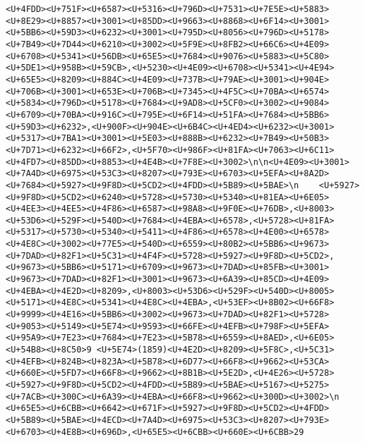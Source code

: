 \documentclass[
]{article}
\begin{document}
\begin{verbatim}
<U+4FDD><U+751F><U+6587><U+5316><U+796D><U+7531><U+7E5E><U+5883><U+8E29><U+8857><U+3001><U+85DD><U+9663><U+8868><U+6F14><U+3001><U+5BB6><U+59D3><U+6232><U+3001><U+795D><U+8056><U+796D><U+5178><U+7B49><U+7D44><U+6210><U+3002><U+5F9E><U+8FB2><U+66C6><U+4E09><U+6708><U+5341><U+56DB><U+65E5><U+7684><U+9076><U+5883><U+5C80><U+5DE1><U+958B><U+59CB>,<U+5230><U+4E09><U+6708><U+5341><U+4E94><U+65E5><U+8209><U+884C><U+4E09><U+737B><U+79AE><U+3001><U+904E><U+706B><U+3001><U+653E><U+706B><U+7345><U+4F5C><U+70BA><U+6574><U+5834><U+796D><U+5178><U+7684><U+9AD8><U+5CF0><U+3002><U+9084><U+6709><U+70BA><U+916C><U+795E><U+6F14><U+51FA><U+7684><U+5BB6><U+59D3><U+6232>,<U+900F><U+904E><U+6B4C><U+4ED4><U+6232><U+3001><U+5317><U+7BA1><U+3001><U+5E03><U+888B><U+6232><U+7B49><U+50B3><U+7D71><U+6232><U+66F2>,<U+5F70><U+986F><U+81FA><U+7063><U+6C11><U+4FD7><U+85DD><U+8853><U+4E4B><U+7F8E><U+3002>\n\n<U+4E09><U+3001> <U+7A4D><U+6975><U+53C3><U+8207><U+793E><U+6703><U+5EFA><U+8A2D><U+7684><U+5927><U+9F8D><U+5CD2><U+4FDD><U+5B89><U+5BAE>\n    <U+5927><U+9F8D><U+5CD2><U+6240><U+5728><U+5730><U+5340><U+81EA><U+6E05><U+4EE3><U+4EE5><U+4F86><U+6587><U+98A8><U+9F0E><U+76DB>,<U+8003><U+53D6><U+529F><U+540D><U+7684><U+4EBA><U+6578>,<U+5728><U+81FA><U+5317><U+5730><U+5340><U+5411><U+4F86><U+6578><U+4E00><U+6578><U+4E8C><U+3002><U+77E5><U+540D><U+6559><U+80B2><U+5BB6><U+9673><U+7DAD><U+82F1><U+5C31><U+4F4F><U+5728><U+5927><U+9F8D><U+5CD2>,<U+9673><U+5BB6><U+5171><U+6709><U+9673><U+7DAD><U+85FB><U+3001><U+9673><U+7DAD><U+82F1><U+3001><U+9673><U+6A39><U+85CD><U+4E09><U+4EBA><U+4E2D><U+8209>,<U+8003><U+53D6><U+529F><U+540D><U+8005><U+5171><U+4E8C><U+5341><U+4E8C><U+4EBA>,<U+53EF><U+8B02><U+66F8><U+9999><U+4E16><U+5BB6><U+3002><U+9673><U+7DAD><U+82F1><U+5728><U+9053><U+5149><U+5E74><U+9593><U+66FE><U+4EFB><U+798F><U+5EFA><U+95A9><U+7E23><U+7684><U+7E23><U+5B78><U+6559><U+8AED>,<U+6E05><U+54B8><U+8C50>9 <U+5E74>(1859)<U+4E2D><U+8209><U+5F8C>,<U+5C31><U+4EFB><U+824B><U+823A><U+5B78><U+6D77><U+66F8><U+9662><U+53CA><U+660E><U+5FD7><U+66F8><U+9662><U+8B1B><U+5E2D>,<U+4E26><U+5728><U+5927><U+9F8D><U+5CD2><U+4FDD><U+5B89><U+5BAE><U+5167><U+5275><U+7ACB><U+300C><U+6A39><U+4EBA><U+66F8><U+9662><U+300D><U+3002>\n    <U+65E5><U+6CBB><U+6642><U+671F><U+5927><U+9F8D><U+5CD2><U+4FDD><U+5B89><U+5BAE><U+4ECD><U+7A4D><U+6975><U+53C3><U+8207><U+793E><U+6703><U+4E8B><U+696D>,<U+65E5><U+6CBB><U+660E><U+6CBB>29 
\end{verbatim}
\end{document}
